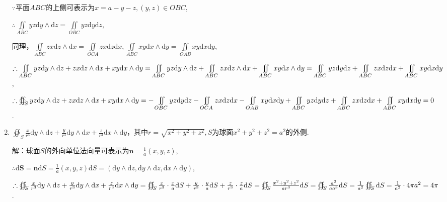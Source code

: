 \documentclass[12pt,UTF8,fleqn]{ctexart}
\newcommand{\md}[1]{\mathrm d#1}
\newcommand{\BSIInt}[2]{\iint\limits_{#1}#2}
\newcommand{\BSOIInt}[2]{\oiint\nolimits_{#1}#2}
\begin{document}
\begin{enumerate}
$\because$平面$ABC$的上侧可表示为$x=a-y-z,(y,z)\in OBC$,

$\therefore\BSIInt{ABC}yz\md y\wedge\md z=\BSIInt{OBC}yz\md y\md z$,

同理，$\BSIInt{ABC}zx\md z\wedge\md x=\BSIInt{OCA}zx\md z\md x,\BSIInt{ABC}xy\md x\wedge\md y=\BSIInt{OAB}xy\md x\md y$,

$\therefore\BSIInt{ABC}yz\md y\wedge\md z+zx\md z\wedge\md x+xy\md x\wedge\md y=\BSIInt{ABC}yz\md y\wedge\md z+\BSIInt{ABC}zx\md z\wedge\md x+\BSIInt{ABC}xy\md x\wedge\md y\\
=\BSIInt{ABC}yz\md y\md z+\BSIInt{ABC}zx\md z\md x+\BSIInt{ABC}xy\md x\md y$,

$\therefore\BSOIInt S{yz\md y\wedge\md z+zx\md z\wedge\md x+xy\md x\wedge\md y}=-\BSIInt{OBC}yz\md y\md z-\BSIInt{OCA}zx\md z\md x-\BSIInt{OAB}xy\md x\md y\\
+\BSIInt{ABC}yz\md y\md z+\BSIInt{ABC}zx\md z\md x+\BSIInt{ABC}xy\md x\md y\\
=0$.

\item$\BSOIInt S{\frac x{r^3}\md y\wedge\md z+\frac y{r^3}\md y\wedge\md x+\frac z{r^3}\md x\wedge\md y}$，其中$r=\sqrt{x^2+y^2+z^2},S$为球面$x^2+y^2+z^2=a^2$的外侧.

解：球面$S$的外向单位法向量可表示为$\bm n=\frac1a(x,y,z)$,

$\therefore\md\bm S=\bm n\md S=\frac1a(x,y,z)\md S=(\md y\wedge\md z,\md y\wedge\md z,\md x\wedge\md y)$,

$\therefore\BSOIInt S{\frac x{r^3}\md y\wedge\md z+\frac y{r^3}\md y\wedge\md x+\frac z{r^3}\md x\wedge\md y}=\BSOIInt S{\frac x{r^3}\cdot\frac xa\md S+\frac y{r^3}\cdot\frac ya\md S+\frac z{r^3}\cdot\frac za\md S}=\BSOIInt S{\frac{x^2+y^2+z^2}{ar^3}\md S}\\
=\BSOIInt S{\frac{a^2}{aa^3}\md S}=\frac1{a^2}\BSOIInt S{\md S}=\frac1{a^2}\cdot4\pi a^2=4\pi$.
\end{enumerate}
\end{document}
